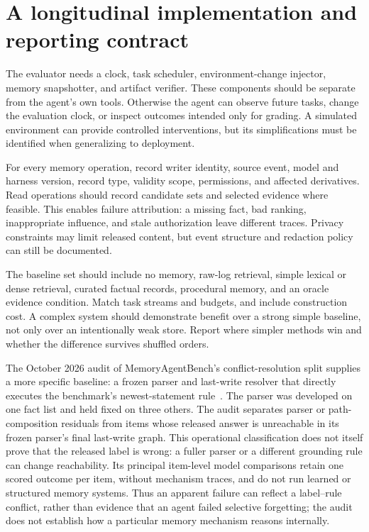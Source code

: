\section{A longitudinal implementation and reporting contract}\label{sec:C27:implementation}
The evaluator needs a clock, task scheduler, environment-change injector, memory snapshotter, and artifact verifier. These components should be separate from the agent's own tools. Otherwise the agent can observe future tasks, change the evaluation clock, or inspect outcomes intended only for grading. A simulated environment can provide controlled interventions, but its simplifications must be identified when generalizing to deployment.

For every memory operation, record writer identity, source event, model and harness version, record type, validity scope, permissions, and affected derivatives. Read operations should record candidate sets and selected evidence where feasible. This enables failure attribution: a missing fact, bad ranking, inappropriate influence, and stale authorization leave different traces. Privacy constraints may limit released content, but event structure and redaction policy can still be documented.

The baseline set should include no memory, raw-log retrieval, simple lexical or dense retrieval, curated factual records, procedural memory, and an oracle evidence condition. Match task streams and budgets, and include construction cost. A complex system should demonstrate benefit over a strong simple baseline, not only over an intentionally weak store. Report where simpler methods win and whether the difference survives shuffled orders.

The October 2026 audit of MemoryAgentBench's conflict-resolution split supplies a more specific baseline: a frozen parser and last-write resolver that directly executes the benchmark's newest-statement rule~\cite{pakhomov2026gold}. The parser was developed on one fact list and held fixed on three others. The audit separates parser or path-composition residuals from items whose released answer is unreachable in its frozen parser's final last-write graph. This operational classification does not itself prove that the released label is wrong: a fuller parser or a different grounding rule can change reachability. Its principal item-level model comparisons retain one scored outcome per item, without mechanism traces, and do not run learned or structured memory systems. Thus an apparent failure can reflect a label--rule conflict, rather than evidence that an agent failed selective forgetting; the audit does not establish how a particular memory mechanism reasons internally.

